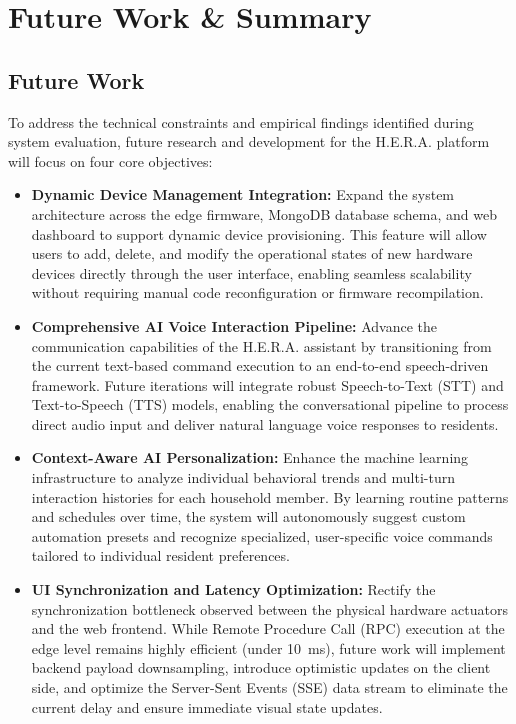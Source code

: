 \newpage
\section{Future Work \& Summary}
\subsection{Future Work}

To address the technical constraints and empirical findings identified during system evaluation, future research and development for the H.E.R.A. platform will focus on four core objectives:

\begin{itemize}
    \item \textbf{Dynamic Device Management Integration:} Expand the system architecture across the edge firmware, MongoDB database schema, and web dashboard to support dynamic device provisioning. This feature will allow users to add, delete, and modify the operational states of new hardware devices directly through the user interface, enabling seamless scalability without requiring manual code reconfiguration or firmware recompilation.
    \item \textbf{Comprehensive AI Voice Interaction Pipeline:} Advance the communication capabilities of the H.E.R.A. assistant by transitioning from the current text-based command execution to an end-to-end speech-driven framework. Future iterations will integrate robust Speech-to-Text (STT) and Text-to-Speech (TTS) models, enabling the conversational pipeline to process direct audio input and deliver natural language voice responses to residents.
    \item \textbf{Context-Aware AI Personalization:} Enhance the machine learning infrastructure to analyze individual behavioral trends and multi-turn interaction histories for each household member. By learning routine patterns and schedules over time, the system will autonomously suggest custom automation presets and recognize specialized, user-specific voice commands tailored to individual resident preferences.
    \item \textbf{UI Synchronization and Latency Optimization:} Rectify the synchronization bottleneck observed between the physical hardware actuators and the web frontend. While Remote Procedure Call (RPC) execution at the edge level remains highly efficient (under \SI{10}{\ms}), future work will implement backend payload downsampling, introduce optimistic updates on the client side, and optimize the Server-Sent Events (SSE) data stream to eliminate the current delay and ensure immediate visual state updates.
\end{itemize}
